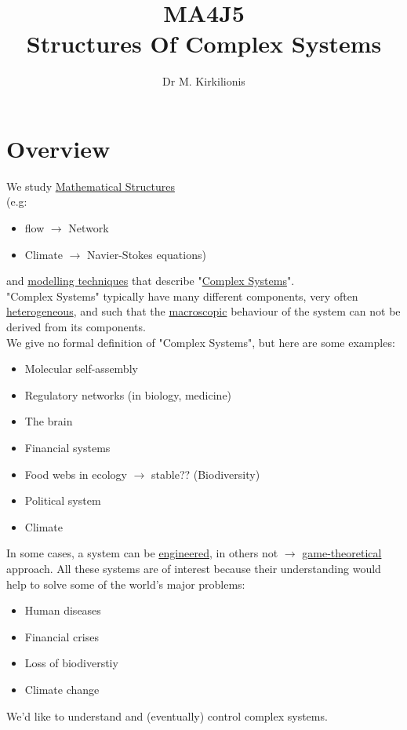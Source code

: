 \documentclass[11pt]{book}
\begin{document}
\begin{titlepage}

\title{MA4J5 \\ Structures Of Complex Systems}
\author{Dr M. Kirkilionis}
\maketitle

\end{titlepage}
\tableofcontents
\newpage
\section{Overview}

We study \underline{Mathematical Structures}\\
(e.g: \begin{itemize}
\item flow $\rightarrow$ Network \\
\item Climate $\rightarrow$ Navier-Stokes equations)
\end{itemize}
and \underline{modelling techniques} that describe "\underline{Complex Systems}".\\

"Complex Systems" typically have many different components, very often \underline{heterogeneous}, and such that the \underline{macroscopic} behaviour of the system can not be derived from its components.\\

We give no formal definition of "Complex Systems", but here are some examples:
\begin{itemize}
\item Molecular self-assembly
\item Regulatory networks (in biology, medicine)
\item The brain
\item Financial systems
\item Food webs in ecology $\rightarrow$ stable?? (Biodiversity)
\item Political system
\item Climate 
\end{itemize}
In some cases, a system can be \underline{engineered}, in others not $\rightarrow$ \underline{game-theoretical} approach.
All these systems are of interest because their understanding would help to solve some of the world's major problems:
\begin{itemize}
\item Human diseases
\item Financial crises
\item Loss of biodiverstiy
\item Climate change
\end{itemize}
We'd like to understand and (eventually) control complex systems.\\
\end{document}
